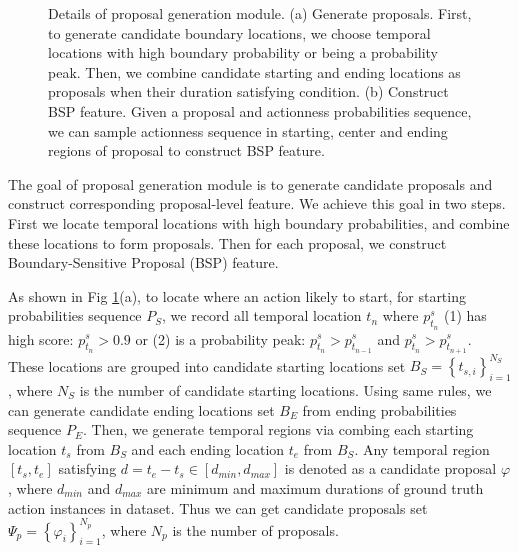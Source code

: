 \documentclass[runningheads]{llncs}
\begin{document}
\begin{figure}[t] 
\setlength{\abovecaptionskip}{-0.0cm} %
\setlength{\belowcaptionskip}{-0.5cm} %
\centering  
\makeatletter\def\@captype{figure}\makeatother 
{} 
\hspace{-0.2 in}  
\caption{Details of proposal generation module. (a) Generate proposals. First, to generate candidate boundary locations, we choose temporal locations with high boundary probability or being a probability peak. Then, we combine candidate starting and ending locations as proposals when their duration satisfying  condition. 
(b) Construct BSP feature. Given a proposal and actionness probabilities sequence, we can sample actionness sequence in starting, center and ending regions of proposal to construct BSP feature.} 
\label{fig_pgm} 
\end{figure} 



The goal of proposal generation module is to generate candidate proposals and construct corresponding proposal-level feature.
We achieve this goal in two steps. First we locate temporal locations with high boundary probabilities, and combine these locations to form proposals. Then for each proposal, we construct Boundary-Sensitive Proposal (BSP) feature.

As shown in Fig \ref{fig_pgm}(a), to locate where an action likely to start, for starting probabilities sequence $P_S$, we record all temporal location $t_n$ where  $p^s_{t_n}$ (1) has high score: $p^s_{t_n}> 0.9$ or  (2) is a probability peak: $p^s_{t_n}> p^s_{t_{n-1}}$ and $p^s_{t_n}> p^s_{t_{n+1}}$.
These locations are  grouped into candidate starting locations set $B_S=\left \{ t_{s,i} \right \}_{i=1}^{N_S}$, where $N_S$ is the number of candidate starting locations. 
%
Using same rules, we can generate candidate ending locations set $B_E$ from ending probabilities sequence $P_E$.
Then, we generate temporal regions via combing each starting location $t_{s}$ from $B_S$ and each ending location $t_{e}$ from $B_S$. 
Any temporal region $\left [ t_s, t_e \right ]$ satisfying $ d=t_e- t_s \in [d_{min}, d_{max}]$ is denoted as a candidate proposal $\varphi$, where $d _{min}$ and $d_{max}$ are minimum and maximum durations of ground truth action instances in dataset. Thus we can get candidate proposals set $\Psi_p=\left \{ \varphi_i \right \}_{i=1}^{N_p}$, where $N_p$ is the number of proposals. 
\end{document}
